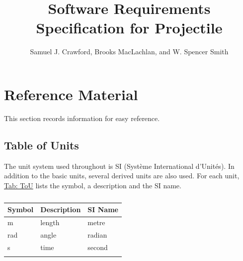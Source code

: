 \documentclass[12pt]{article}
\title{Software Requirements Specification for Projectile}
\author{Samuel J. Crawford, Brooks MacLachlan, and W. Spencer Smith}
\begin{document}
\maketitle
\tableofcontents
\newpage
\section{Reference Material}
\label{Sec:RefMat}
This section records information for easy reference.
\subsection{Table of Units}
\label{Sec:ToU}
The unit system used throughout is SI (Système International d'Unités). In addition to the basic units, several derived units are also used. For each unit, \hyperref[Table:ToU]{Tab: ToU} lists the symbol, a description and the SI name.
\begin{longtable}{l l l}
\toprule
\textbf{Symbol} & \textbf{Description} & \textbf{SI Name}
\\
\midrule
\endhead
m & length & metre
\\
rad & angle & radian
\\
s & time & second
\\
\bottomrule
\caption{}
\label{Table:ToU}
\end{longtable}
\end{document}
